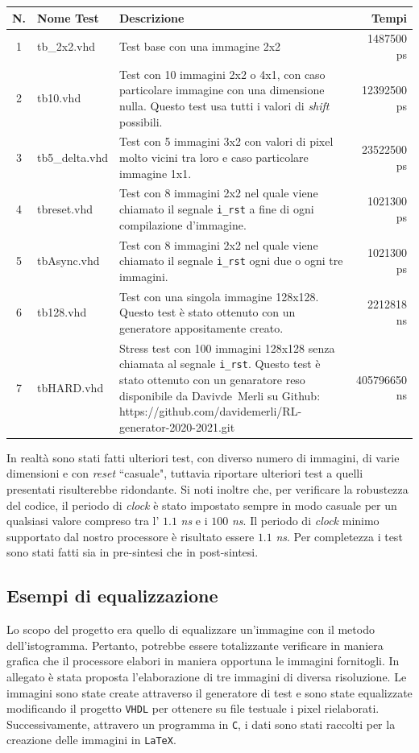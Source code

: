 \documentclass[11pt, a4paper]{article}
\begin{document}
\begin{center}
  \begin{tabular}{|c|l|p{8.5cm}|r|}
    \hline
    N. &Nome Test & Descrizione & Tempi\\
    \hline \hline
    1 & tb\_2x2.vhd & Test base con una immagine 2x2 & 1487500 ps \\
    \hline
    2 & tb10.vhd & Test con 10 immagini 2x2 o 4x1, con caso particolare immagine con una dimensione nulla. Questo test usa tutti i valori di \textit{shift} possibili.&12392500 ps\\
    \hline
    3 & tb5\_delta.vhd & Test con 5 immagini 3x2 con valori di pixel molto vicini tra loro e caso particolare immagine 1x1. & 23522500 ps\\
    \hline
    4 & tbreset.vhd & Test con 8 immagini 2x2 nel quale viene chiamato il segnale \texttt{i\_rst} a fine di ogni compilazione d'immagine. & 1021300 ps\\
    \hline
    5 & tbAsync.vhd & Test con 8 immagini 2x2 nel quale viene chiamato il segnale \texttt{i\_rst} ogni due o ogni tre immagini. & 1021300 ps\\
    \hline
    6& tb128.vhd & Test con una singola immagine 128x128. Questo test è stato ottenuto con un generatore appositamente creato. & 2212818 ns\\
    \hline
    7 & tbHARD.vhd & Stress test con 100 immagini 128x128 senza chiamata al segnale \texttt{i\_rst}. Questo test è stato ottenuto con un genaratore reso disponibile da \mbox{Davivde Merli} su Github: https://github.com/davidemerli/RL-generator-2020-2021.git & 405796650 ns\\
    \hline
  \end{tabular}
\end{center}
In realtà sono stati fatti ulteriori test, con diverso numero di immagini, di varie dimensioni e con \textit{reset} ``casuale", tuttavia riportare ulteriori test a quelli presentati risulterebbe ridondante.
Si noti inoltre che, per verificare la robustezza del codice, il periodo di \textit{clock} è stato impostato sempre in modo casuale per un qualsiasi valore compreso tra l' $1.1$ \textit{ns} e i $100$ \textit{ns}. Il periodo di \textit{clock} minimo supportato dal nostro processore è risultato essere $1.1$ \textit{ns}. Per completezza i test sono stati fatti sia in pre-sintesi che in post-sintesi.
\pagebreak

\subsection{Esempi di equalizzazione}
Lo scopo del progetto era quello di equalizzare un'immagine con il metodo dell'istogramma. Pertanto, potrebbe essere totalizzante verificare in maniera grafica che il processore elabori in maniera opportuna le immagini fornitogli. In allegato è stata proposta l'elaborazione di tre immagini di diversa risoluzione. Le immagini sono state create attraverso il generatore di test e sono state equalizzate modificando il progetto \texttt{VHDL} per ottenere su file testuale i pixel rielaborati. Successivamente, attravero un programma in \texttt{C}, i dati sono stati raccolti per la creazione delle immagini in \texttt{LaTeX}.\\
\end{document}
